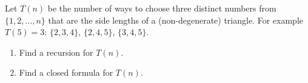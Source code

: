 Let $T(n)$ be the number of ways to choose three distinct numbers from $\{1,2,\dots,n\}$ that are the side lengths of a (non-degenerate) triangle. For example $T(5)=3$: $\{2,3,4\}$, $\{2,4,5\}$, $\{3,4,5\}$.
\begin{enumerate}
\item[(a)] Find a recursion for $T(n)$.
\item[(b)] Find a closed formula for $T(n)$.
\end{enumerate}
